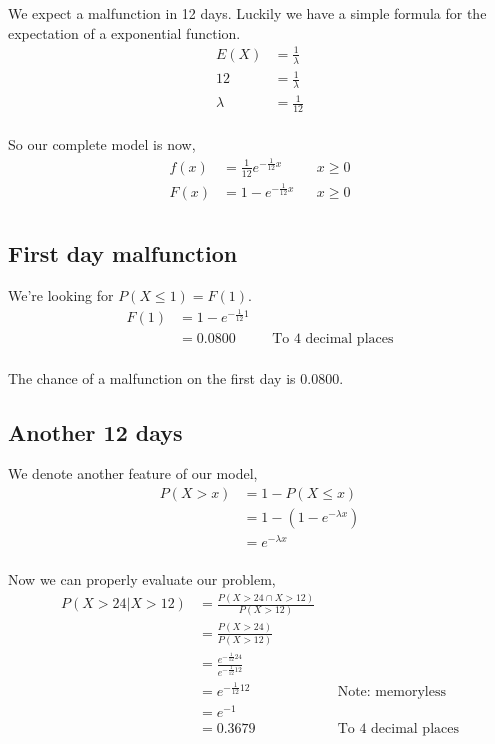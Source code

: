 \documentclass{article}
\begin{document}
We expect a malfunction in 12 days. Luckily we have a simple formula for the
expectation of a exponential function.
\begin{align*}
    E(X) &= \frac{1}{\lambda} \\
    12 &= \frac{1}{\lambda} \\
    \lambda &= \frac{1}{12} \\
\end{align*}

So our complete model is now,
\begin{align*}
    f(x) &= \frac{1}{12} e^{-\frac{1}{12} x} && x\geq0 \\
    F(x) &= 1-e^{-\frac{1}{12} x} && x\geq0 \\
\end{align*}

\subsection{First day malfunction}
We're looking for $P(X \leq 1) = F(1)$.
\begin{align*}
    F(1) &= 1 - e^{-\frac{1}{12} 1} \\
    &= 0.0800 && \text{To 4 decimal places} \\
\end{align*}

The chance of a malfunction on the first day is 0.0800.

\subsection{Another 12 days}
We denote another feature of our model,
\begin{align*}
    P(X > x) &= 1 - P(X \leq x) \\
    &= 1 - (1 - e^{-\lambda x}) \\
    &= e^{-\lambda x} \\
\end{align*}

Now we can properly evaluate our problem,
\begin{align*}
    P(X > 24|X > 12) &= \frac{P(X>24 \cap X>12)}{P(X > 12)} \\
    &= \frac{P(X>24)}{P(X > 12)} \\
    &= \frac{e^{-\frac{1}{12} 24}}{e^{-\frac{1}{12} 12}} \\
    &= e^{-\frac{1}{12} 12} && \text{Note: memoryless} \\
    &= e^{-1} \\
    &= 0.3679 && \text{To 4 decimal places} \\
\end{align*}
\end{document}
